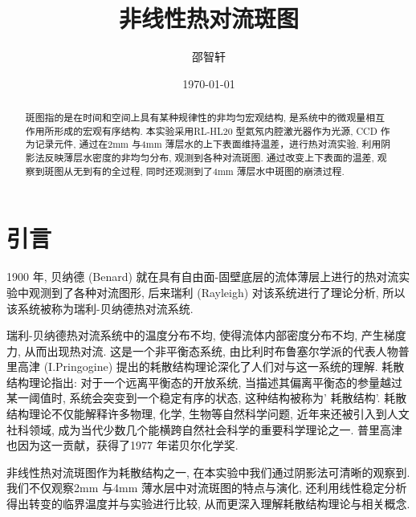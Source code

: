 \documentclass[aps,pre,12pt,preprint,onecolumn,showpacs,showkeys]{revtex4-1}
\begin{document}
\title{\bf\heiti{}非线性热对流斑图\vspace{15mm}}
\author{\fangsong{}邵智轩\vspace{2mm}}
\date{\today}

\begin{abstract}
\vspace{10mm}
\begin{spacing}{1.5}
\songti{}
斑图指的是在时间和空间上具有某种规律性的非均匀宏观结构, 是系统中的微观量相互作用所形成的宏观有序结构. 本实验采用RL-HL20 型氦氖内腔激光器作为光源, CCD 作为记录元件, 通过在2mm 与4mm 薄层水的上下表面维持温差，进行热对流实验, 利用阴影法反映薄层水密度的非均匀分布, 观测到各种对流斑图. 通过改变上下表面的温差, 观察到斑图从无到有的全过程, 同时还观测到了4mm 薄层水中斑图的崩溃过程.
\end{spacing}
\end{abstract}
\maketitle
\songti{}

\section{引言}
	1900 年, 贝纳德 (Benard) 就在具有自由面-固壁底层的流体薄层上进行的热对流实验中观测到了各种对流图形, 后来瑞利 (Rayleigh) 对该系统进行了理论分析, 所以该系统被称为瑞利-贝纳德热对流系统.
	
	瑞利-贝纳德热对流系统中的温度分布不均, 使得流体内部密度分布不均, 产生梯度力, 从而出现热对流. 这是一个非平衡态系统, 由比利时布鲁塞尔学派的代表人物普里高津 (I.Pringogine) 提出的耗散结构理论深化了人们对与这一系统的理解. 耗散结构理论指出: 对于一个远离平衡态的开放系统, 当描述其偏离平衡态的参量越过某一阈值时, 系统会突变到一个稳定有序的状态, 这种结构被称为’ 耗散结构’. 耗散结构理论不仅能解释许多物理, 化学, 生物等自然科学问题, 近年来还被引入到人文社科领域, 成为当代少数几个能横跨自然社会科学的重要科学理论之一. 普里高津也因为这一贡献，获得了1977 年诺贝尔化学奖.
	
	非线性热对流斑图作为耗散结构之一, 在本实验中我们通过阴影法可清晰的观察到. 我们不仅观察2mm 与4mm 薄水层中对流斑图的特点与演化, 还利用线性稳定分析得出转变的临界温度并与实验进行比较, 从而更深入理解耗散结构理论与相关概念.
\end{document}
